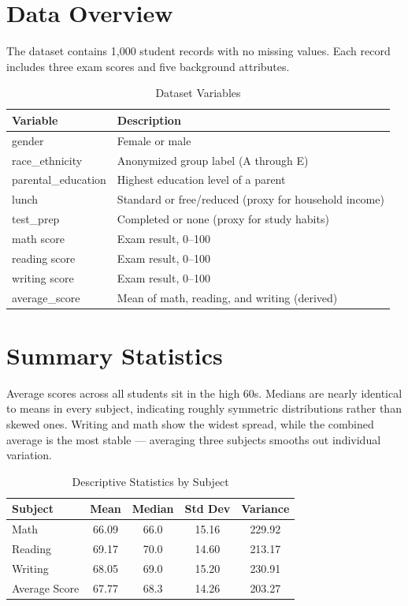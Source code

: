 \documentclass[12pt, letterpaper]{article}
\begin{document}
\section{Data Overview}

The dataset contains 1,000 student records with no missing values. Each record includes three exam scores and five background attributes.

\begin{table}[H]
\centering
\caption{Dataset Variables}
\begin{tabular}{ll}
\toprule
\textbf{Variable} & \textbf{Description} \\
\midrule
gender & Female or male \\
race\_ethnicity & Anonymized group label (A through E) \\
parental\_education & Highest education level of a parent \\
lunch & Standard or free/reduced (proxy for household income) \\
test\_prep & Completed or none (proxy for study habits) \\
math score & Exam result, 0--100 \\
reading score & Exam result, 0--100 \\
writing score & Exam result, 0--100 \\
average\_score & Mean of math, reading, and writing (derived) \\
\bottomrule
\end{tabular}
\end{table}

\section{Summary Statistics}

Average scores across all students sit in the high 60s. Medians are nearly identical to means in every subject, indicating roughly symmetric distributions rather than skewed ones. Writing and math show the widest spread, while the combined average is the most stable --- averaging three subjects smooths out individual variation.

\begin{table}[H]
\centering
\caption{Descriptive Statistics by Subject}
\begin{tabular}{lcccc}
\toprule
\textbf{Subject} & \textbf{Mean} & \textbf{Median} & \textbf{Std Dev} & \textbf{Variance} \\
\midrule
Math          & 66.09 & 66.0 & 15.16 & 229.92 \\
Reading       & 69.17 & 70.0 & 14.60 & 213.17 \\
Writing       & 68.05 & 69.0 & 15.20 & 230.91 \\
Average Score & 67.77 & 68.3 & 14.26 & 203.27 \\
\bottomrule
\end{tabular}
\end{table}
\end{document}
